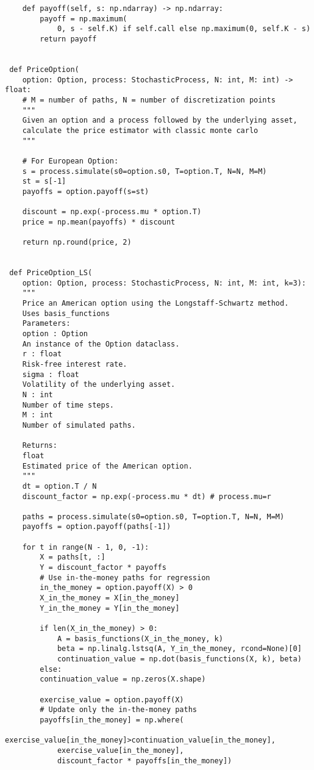 \documentclass[12pt,a4paper,twoside,openany]{book}
\begin{document}
\begin{lstlisting}
 	def payoff(self, s: np.ndarray) -> np.ndarray:
 		payoff = np.maximum(
 			0, s - self.K) if self.call else np.maximum(0, self.K - s)
 		return payoff
 
 
 def PriceOption(
 	option: Option, process: StochasticProcess, N: int, M: int) -> float:     
 	# M = number of paths, N = number of discretization points
 	"""
 	Given an option and a process followed by the underlying asset, 
 	calculate the price estimator with classic monte carlo
 	"""
 	
 	# For European Option:
 	s = process.simulate(s0=option.s0, T=option.T, N=N, M=M)                                        
 	st = s[-1]
 	payoffs = option.payoff(s=st)
 	
 	discount = np.exp(-process.mu * option.T)
 	price = np.mean(payoffs) * discount
 	
 	return np.round(price, 2)
 
 
 def PriceOption_LS(
 	option: Option, process: StochasticProcess, N: int, M: int, k=3):
 	"""
 	Price an American option using the Longstaff-Schwartz method.
 	Uses basis_functions 
 	Parameters:
 	option : Option
 	An instance of the Option dataclass.
 	r : float
 	Risk-free interest rate.
 	sigma : float
 	Volatility of the underlying asset.
 	N : int
 	Number of time steps.
 	M : int
 	Number of simulated paths.
 	
 	Returns:
 	float
 	Estimated price of the American option.
 	"""
 	dt = option.T / N
 	discount_factor = np.exp(-process.mu * dt) # process.mu=r
 	
 	paths = process.simulate(s0=option.s0, T=option.T, N=N, M=M)
 	payoffs = option.payoff(paths[-1])
 	
 	for t in range(N - 1, 0, -1):
 		X = paths[t, :]
 		Y = discount_factor * payoffs
 		# Use in-the-money paths for regression
 		in_the_money = option.payoff(X) > 0
 		X_in_the_money = X[in_the_money]
 		Y_in_the_money = Y[in_the_money]
 	
 		if len(X_in_the_money) > 0: 
 			A = basis_functions(X_in_the_money, k)
 			beta = np.linalg.lstsq(A, Y_in_the_money, rcond=None)[0]
 			continuation_value = np.dot(basis_functions(X, k), beta)
 		else:
 		continuation_value = np.zeros(X.shape)
 	
 		exercise_value = option.payoff(X)
 		# Update only the in-the-money paths
 		payoffs[in_the_money] = np.where(
 			exercise_value[in_the_money]>continuation_value[in_the_money], 
 			exercise_value[in_the_money], 
 			discount_factor * payoffs[in_the_money])
 	

\end{lstlisting}
\end{document}
